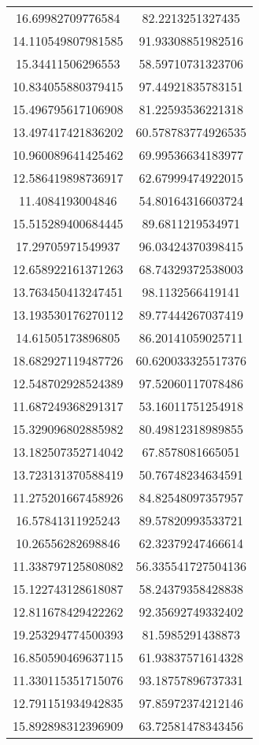 \begin{table}
\begin{tabular}{cc}
16.69982709776584 & 82.2213251327435 \\
14.110549807981585 & 91.93308851982516 \\
15.34411506296553 & 58.59710731323706 \\
10.834055880379415 & 97.44921835783151 \\
15.496795617106908 & 81.22593536221318 \\
13.497417421836202 & 60.578783774926535 \\
10.960089641425462 & 69.99536634183977 \\
12.586419898736917 & 62.67999474922015 \\
11.4084193004846 & 54.80164316603724 \\
15.515289400684445 & 89.6811219534971 \\
17.29705971549937 & 96.03424370398415 \\
12.658922161371263 & 68.74329372538003 \\
13.763450413247451 & 98.1132566419141 \\
13.193530176270112 & 89.77444267037419 \\
14.61505173896805 & 86.20141059025711 \\
18.682927119487726 & 60.620033325517376 \\
12.548702928524389 & 97.52060117078486 \\
11.687249368291317 & 53.16011751254918 \\
15.329096802885982 & 80.49812318989855 \\
13.182507352714042 & 67.8578081665051 \\
13.723131370588419 & 50.76748234634591 \\
11.275201667458926 & 84.82548097357957 \\
16.57841311925243 & 89.57820993533721 \\
10.26556282698846 & 62.32379247466614 \\
11.338797125808082 & 56.335541727504136 \\
15.122743128618087 & 58.24379358428838 \\
12.811678429422262 & 92.35692749332402 \\
19.253294774500393 & 81.5985291438873 \\
16.850590469637115 & 61.93837571614328 \\
11.330115351715076 & 93.18757896737331 \\
12.791151934942835 & 97.85972374212146 \\
15.892898312396909 & 63.72581478343456 \\

\end{tabular}
\end{table}
